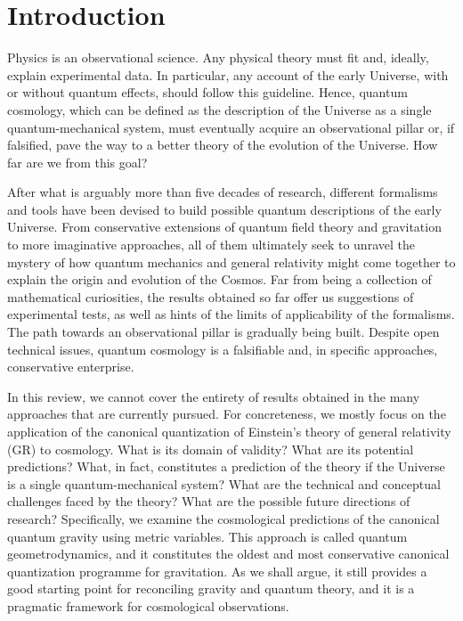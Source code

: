 \documentclass[12pt]{iopart}
\makeatletter
\newcommand{\mainmatter}{%
  \setcounter{footnote}{0}%
  \patchcmd{\@makefntext}{\fnsymbol}{\arabic}{}{}%
  \patchcmd{\@thefnmark}{\fnsymbol}{\arabic}{}{}%
  \def\@makefnmark{\textsuperscript{\arabic{footnote}}}%
}
\makeatother
\begin{document}
\mainmatter

\section{\label{Intro}Introduction}
Physics is an observational science. Any physical theory must  fit and, ideally, explain experimental data. In particular, any account of the early Universe, with or without quantum effects, should follow this guideline. Hence, quantum cosmology, which can be defined as the description of the Universe as a single quantum-mechanical system, must eventually acquire an observational pillar or, if falsified, pave the way to a better theory of the evolution of the Universe. How far are we from this goal?

After what is arguably more than five decades of research, different formalisms and tools have been devised to build possible quantum descriptions of the early Universe. From conservative extensions of quantum field theory and gravitation to more imaginative approaches, all of them ultimately seek to unravel the mystery of how quantum mechanics and general relativity might come together to explain the origin and evolution of the Cosmos. Far from being a collection of mathematical curiosities, the results obtained so far offer us suggestions of experimental tests, as well as hints of the limits of applicability of the formalisms. The path towards an observational pillar is gradually being built. Despite open technical issues, quantum cosmology is a falsifiable and, in specific approaches, conservative enterprise.

In this review, we cannot cover the entirety of results obtained in the many approaches that are currently pursued. For concreteness, we mostly focus on the application of the canonical quantization of Einstein's theory of general relativity (GR) to cosmology. What is its domain of validity? What are its potential predictions? What, in fact, constitutes a prediction of the theory if the Universe is a single quantum-mechanical system? What are the technical and conceptual challenges faced by the theory? What are the possible future directions of research? Specifically, we examine the cosmological predictions of the canonical quantum gravity using metric variables. This approach is called quantum geometrodynamics, and it constitutes the oldest and most conservative canonical quantization programme for gravitation. As we shall argue, it still provides a good starting point for reconciling gravity and quantum theory, and it is a pragmatic framework for cosmological observations.
\end{document}
